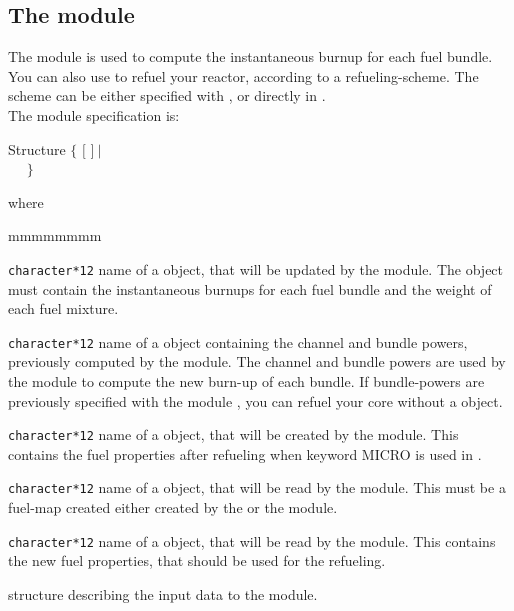 \subsection{The  module}\label{sect:tinst}

\vskip 0.2cm
The  module is used to compute the instantaneous burnup for each fuel bundle.
You can also use  to refuel your reactor, according to a refueling-scheme. 
The scheme can be either specified with , or directly in .\\

\noindent
The  module specification is:

\begin{DataStructure}{Structure }
$\{$  \moc{:=}  
$[$  $]~|$ \\~~
  \moc{:=}   
 $\}$ \\


\moc{::} 
\end{DataStructure}

\noindent where

\begin{ListeDeDescription}{mmmmmmmm}

\item[\dusa{FMAP}] \texttt{character*12} name of a  object,
that will be updated by the  module. The  object
must contain the instantaneous burnups for each fuel bundle and the weight of
each fuel mixture.

\item[\dusa{POWER}] \texttt{character*12} name of a  object
containing the channel and bundle powers, previously computed by the
 module. The channel and bundle powers are used by the
 module to compute the new burn-up of each bundle. If bundle-powers are
previously specified with the module , you can refuel
your core without a  object.

\item[\dusa{MICLIB3}] \texttt{character*12} name of a  object,
that will be created by the  module. This  contains the fuel properties after refueling when keyword MICRO is used in .

\item[\dusa{MICLIB2}] \texttt{character*12} name of a  object,
that will be read by the  module. This must be a fuel-map  created either created by the  or the  module.

\item[\dusa{MICLIB}] \texttt{character*12} name of a  object,
that will be read by the  module. This  contains the new fuel properties, that should be used for the refueling.

\item[\dstr{desctinst}] structure describing the input data to the  module.

\end{ListeDeDescription}

